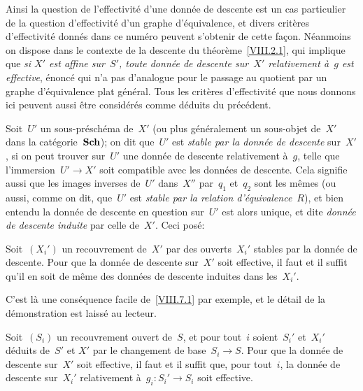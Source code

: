 Ainsi la question de l'effectivit\'e d'une donn\'ee de descente
est un cas particulier de la question d'effectivit\'e d'un graphe
d'\'equivalence, et divers crit\`eres d'effectivit\'e donn\'es
dans ce num\'ero peuvent s'obtenir de cette fa\c con. N\'eanmoins on dispose dans le contexte de la descente du
th\'eor\`eme~\ref{VIII.2.1}, qui implique que \emph{si $X'$ est
affine sur~$S'$, toute donnée de descente sur~$X'$ relativement
à~$g$ est effective}, \'enonc\'e qui n'a pas d'analogue pour
le passage au quotient par un graphe d'\'equivalence plat
g\'en\'eral. Tous les crit\`eres d'effectivit\'e que nous
donnons ici peuvent aussi \^etre consid\'er\'es comme
d\'eduits du pr\'ec\'edent.

Soit~$U'$ un sous-pr\'esch\'ema de~$X'$ (ou plus
g\'en\'eralement un sous-objet de~$X'$ dans la
cat\'egorie~$\mathbf{Sch}$); on dit que~$U'$ est \emph{stable par la
donnée de descente} sur~$X'$, si on peut trouver sur~$U'$ une
donn\'ee de descente relativement \`a~$g$, telle que
l'immersion~$U'\to X'$ soit compatible avec les donn\'ees de
descente. Cela signifie aussi que les images inverses de~$U'$
dans~$X''$ par~$q_{1}$ et~$q_{2}$ sont les m\^emes (ou aussi, comme
on dit, que~$U'$ est \emph{stable par la relation
d'équivalence}~$R$), et bien entendu la donn\'ee de descente en
question sur~$U'$ est alors unique, et dite \emph{donnée de
descente induite}
par celle de~$X'$. Ceci pos\'e:

\begin{proposition}
\label{VIII.7.2}
Soit~$(X_{i}')$ un recouvrement de~$X'$ par des ouverts~$X_{i}'$
stables
par la donn\'ee de descente. Pour que la donn\'ee de descente
sur~$X'$ soit effective, il faut et il suffit qu'il en soit de
m\^eme des donn\'ees de descente induites dans les~$X_{i}'$.
\end{proposition}

C'est l\`a une cons\'equence facile de~\ref{VIII.7.1} par exemple,
et le d\'etail de la d\'emonstration est laiss\'e au lecteur.

\begin{corollaire}
\label{VIII.7.3}
Soit~$(S_{i})$ un recouvrement ouvert de~$S$, et pour tout~$i$
soient~$S_{i}'$ et~$X_{i}'$ d\'eduits de~$S'$
et
$X'$ par le changement de base~$S_{i}\to S$. Pour que la donn\'ee de
descente sur~$X'$ soit effective, il faut et il suffit que, pour
tout~$i$, la donn\'ee de descente sur~$X_{i}'$ relativement
\`a~$g_{i}\colon S_{i}'\to S_{i}$ soit effective.
\end{corollaire}

